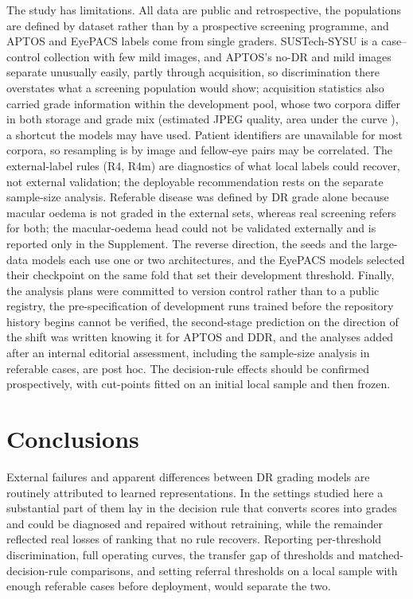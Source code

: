 The study has limitations. All data are public and retrospective, the populations are defined by
dataset rather than by a prospective screening programme, and APTOS and EyePACS labels come from
single graders. SUSTech-SYSU is a case--control collection with few mild images, and APTOS's no-DR
and mild images separate unusually easily, partly through acquisition, so discrimination there
overstates what a screening population would show; acquisition statistics also carried grade
information within the development pool, whose two corpora differ in both storage and grade mix
(estimated JPEG quality, area under the curve ), a shortcut the models
may have used. Patient identifiers are unavailable for most corpora, so resampling is by image
and fellow-eye pairs may be correlated. The external-label rules (R4, R4m) are diagnostics of what
local labels could recover, not external validation; the deployable recommendation rests on the
separate sample-size analysis. Referable disease was defined by DR grade alone because macular
oedema is not graded in the external sets, whereas real screening refers for both; the
macular-oedema head could not be validated externally and is reported only in the Supplement. The
reverse direction, the seeds and the large-data models each use one or two architectures, and the
EyePACS models selected their checkpoint on the same fold that set their development threshold.
Finally, the analysis plans were committed to version control rather than to a public registry,
the pre-specification of development runs trained before the repository history begins cannot be
verified, the second-stage prediction on the direction of the shift was written knowing it for
APTOS and DDR, and the analyses added after an internal editorial assessment, including the
sample-size analysis in referable cases, are post hoc. The decision-rule effects should be confirmed prospectively, with cut-points fitted on
an initial local sample and then frozen.

\section{Conclusions}\label{sec:conclusions}

External failures and apparent differences between DR grading models are routinely attributed to
learned representations. In the settings studied here a substantial part of them lay in the
decision rule that converts scores into grades and could be diagnosed and repaired without
retraining, while the remainder reflected real losses of ranking that no rule recovers. Reporting
per-threshold discrimination, full operating curves, the transfer gap of thresholds and
matched-decision-rule comparisons, and setting referral thresholds on a local sample with enough
referable cases before deployment, would separate the two.
